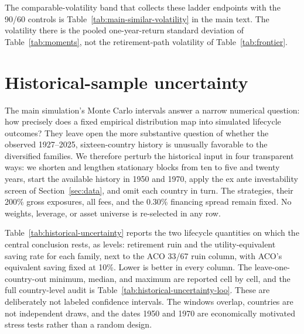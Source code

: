 \documentclass[11pt]{article}
\begin{document}
The comparable-volatility band that collects these ladder endpoints with the
90/60 controls is Table~\ref{tab:main-similar-volatility} in the main text. The
volatility there is the pooled one-year-return standard deviation of
Table~\ref{tab:moments}, not the retirement-path volatility of
Table~\ref{tab:frontier}.

\section{Historical-sample uncertainty}
\label{app:historical-uncertainty}

The main simulation's Monte Carlo intervals answer a narrow numerical question:
how precisely does a fixed empirical distribution map into simulated lifecycle
outcomes? They leave open the more substantive question of whether the observed
1927--2025, sixteen-country history is unusually favorable to the diversified
families. We therefore perturb the historical input in four transparent ways:
we shorten and lengthen stationary blocks from ten to five and twenty years,
start the available history in 1950 and 1970, apply the ex ante investability
screen of Section~\ref{sec:data}, and omit each country in turn. The
strategies, their 200\% gross exposures, all fees, and the 0.30\% financing
spread remain fixed. No weights, leverage, or asset universe is re-selected in
any row.

Table~\ref{tab:historical-uncertainty} reports the two lifecycle quantities on
which the central conclusion rests, as levels: retirement ruin and the
utility-equivalent saving rate for each family, next to the ACO 33/67 ruin
column, with ACO's equivalent saving fixed at 10\%. Lower is better in every
column. The leave-one-country-out minimum, median, and maximum are reported
cell by cell, and the full country-level audit is
Table~\ref{tab:historical-uncertainty-loo}. These are deliberately not
labeled confidence intervals. The windows overlap, countries are not
independent draws, and the dates 1950 and 1970 are economically motivated
stress tests rather than a random design.


\end{document}

